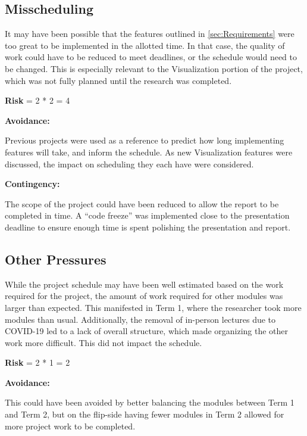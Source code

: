 \subsection{Misscheduling}
It may have been possible that the features outlined in \cref{sec:Requirements} were too great to be implemented in the allotted time.
In that case, the quality of work could have to be reduced to meet deadlines, or the schedule would need to be changed.
This is especially relevant to the Visualization portion of the project, which was not fully planned until the research was completed.

\textbf{Risk} = 2 * 2 = 4

\textbf{Avoidance:}

\hspace{20pt}Previous projects were used as a reference to predict how long implementing features will take, and inform the schedule.
As new Visualization features were discussed, the impact on scheduling they each have were considered.

\textbf{Contingency:}

\hspace{20pt}The scope of the project could have been reduced to allow the report to be completed in time.
A ``code freeze'' was implemented close to the presentation deadline to ensure enough time is spent polishing the presentation and report.

\subsection{Other Pressures}
While the project schedule may have been well estimated based on the work required for the project, the amount of work required for other modules was larger than expected.
This manifested in Term 1, where the researcher took more modules than usual. 
Additionally, the removal of in-person lectures due to COVID-19 led to a lack of overall structure, which made organizing the other work more difficult.
This did not impact the schedule.

\textbf{Risk} = 2 * 1 = 2

\textbf{Avoidance:}

\hspace{20pt}This could have been avoided by better balancing the modules between Term 1 and Term 2, but on the flip-side having fewer modules in Term 2 allowed for more project work to be completed.


